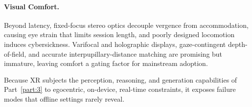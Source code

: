 \paragraph{Visual Comfort.} Beyond latency, fixed-focus stereo optics decouple vergence from accommodation, causing eye strain that limits session length, and poorly designed locomotion induces cybersickness. 
Varifocal and holographic displays, gaze-contingent depth-of-field, and accurate interpupillary-distance matching are promising but immature, leaving comfort a gating factor for mainstream adoption.

Because XR subjects the perception, reasoning, and generation capabilities of Part~\ref{part:3} to egocentric, on-device, real-time constraints, it exposes failure modes that offline settings rarely reveal.
